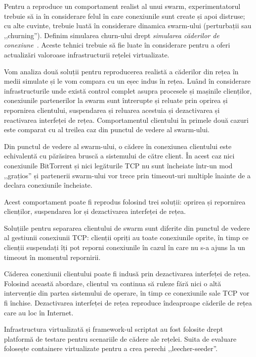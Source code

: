Pentru a reproduce un comportament realist al unui swarm, experimentatorul
trebuie să ia în considerare felul în care conexiunile sunt create și
apoi distruse; cu alte cuvinte, trebuie luată în considerare dinamica
swarm-ului (perturbații sau ,,churning''). Definim simularea churn-ului
drept \textit{simularea căderilor de conexiune}~\cite{simulating-dropouts}.
Aceste tehnici trebuie să fie luate în considerare pentru a oferi actualizări
valoroase infrastructurii rețelei virtualizate.

Vom analiza două soluții pentru reproducerea realistă a căderilor din rețea
în medii simulate și le vom compara cu un eșec indus în rețea. Luând în
considerare infrastructurile unde există control complet asupra procesele
și mașinile clienților, conexiunile partenerilor la swarm sunt întrerupte
și reluate prin oprirea și repornirea clientului, suspendarea și reluarea
acestuia și dezactivarea și reactivarea interfeței de rețea. Comportamentul
clientului în primele două cazuri este comparat cu al treilea caz din
punctul de vedere al swarm-ului.

Din punctul de vedere al swarm-ului, o cădere în conexiunea clientului
este echivalentă cu părăsirea bruscă a sistemului de către client.
În acest caz nici conexiunile BitTorrent și nici legăturile TCP nu sunt
încheiate într-un mod ,,grațios'' și partenerii swarm-ului vor trece
prin timeout-uri multiple înainte de a declara conexiunile încheiate.

Acest comportament poate fi reprodus folosind trei soluții: oprirea
și repornirea clienților, suspendarea lor și dezactivarea interfeței
de rețea.

Soluțiile pentru separarea clientului de swarm sunt diferite din
punctul de vedere al gestiunii conexiunii TCP: clienții opriți au toate
conexiunile oprite, în timp ce clienții suspendați îți pot reporni
conexiunile în cazul în care nu s-a ajuns la un timeout în momentul
repornirii.

Căderea conexiunii clientului poate fi indusă prin dezactivarea interfeței
de rețea. Folosind această abordare, clientul va continua să ruleze fără
nici o altă intervenție din partea sistemului de operare, în timp ce
conexiunile sale TCP vor fi închise. Dezactivarea interfeței de rețea
reproduce îndeaproape căderile de rețea care au loc în Internet.

Infrastructura virtualizată și framework-ul scriptat au fost folosite
drept platformă de testare pentru scenariile de cădere ale rețelei.
Suita de evaluare folosește containere virtualizate pentru a crea
perechi ,,leecher-seeder''.

